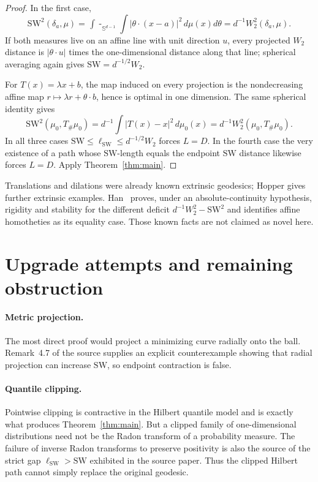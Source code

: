 \documentclass[11pt]{article}
\newcommand{\SW}{\mathrm{SW}}
\newcommand{\ellSW}{\ell_{\mathrm{SW}}}
\newcommand{\sphereavg}{\mathop{\int\!\!\!\!-}_{\mathbb S^{d-1}}}
\begin{document}
\begin{proof}
In the first case,
\[
 \SW^2(\delta_a,\mu)=\sphereavg\int|\theta\cdot(x-a)|^2\,d\mu(x)d\theta
 =d^{-1}W_2^2(\delta_a,\mu).
\]
If both measures live on an affine line with unit direction $u$, every
projected $W_2$ distance is $|\theta\cdot u|$ times the one-dimensional
distance along that line; spherical averaging again gives
$\SW=d^{-1/2}W_2$.

For $T(x)=\lambda x+b$, the map induced on every projection is the
nondecreasing affine map $r\mapsto\lambda r+\theta\cdot b$, hence is optimal
in one dimension. The same spherical identity gives
\[
 \SW^2(\mu_0,T_\#\mu_0)
 =d^{-1}\int|T(x)-x|^2\,d\mu_0(x)
 =d^{-1}W_2^2(\mu_0,T_\#\mu_0).
\]
In all three cases $\SW\le\ellSW\le d^{-1/2}W_2$ forces $L=D$. In the fourth
case the very existence of a path whose $\SW$-length equals the endpoint
$\SW$ distance likewise forces $L=D$. Apply Theorem~\ref{thm:main}.
\end{proof}

Translations and dilations were already known extrinsic geodesics; Hopper
\cite{Hopper} gives further extrinsic examples. Han~\cite{Han} proves, under
an absolute-continuity hypothesis, rigidity and stability for the different
deficit $d^{-1}W_2^2-\SW^2$ and identifies affine homotheties as its equality
case. Those known facts are not claimed as novel here.

\section{Upgrade attempts and remaining obstruction}

\paragraph{Metric projection.}
The most direct proof would project a minimizing curve radially onto the
ball. Remark~4.7 of the source supplies an explicit counterexample showing
that radial projection can increase $\SW$, so endpoint contraction is false.

\paragraph{Quantile clipping.}
Pointwise clipping is contractive in the Hilbert quantile model and is exactly
what produces Theorem~\ref{thm:main}. But a clipped family of one-dimensional
distributions need not be the Radon transform of a probability measure. The
failure of inverse Radon transforms to preserve positivity is also the source
of the strict gap $\ellSW>\SW$ exhibited in the source paper. Thus the clipped
Hilbert path cannot simply replace the original geodesic.
\end{document}
